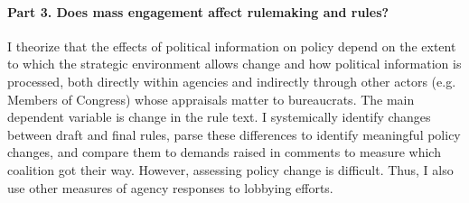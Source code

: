 \paragraph{Part 3. Does mass engagement affect rulemaking and rules?} 
I theorize that the effects of political information on policy depend on the extent to which the strategic environment allows change and how political information is processed, both directly within agencies and indirectly through other actors (e.g. Members of Congress) whose appraisals matter to bureaucrats.
The main dependent variable is change in the rule text.
I systemically identify changes between draft and final rules, parse these differences to identify meaningful policy changes, and compare them to demands raised in comments to measure which coalition got their way. However, assessing policy change is difficult. Thus, I also use other measures of agency responses to lobbying efforts. 